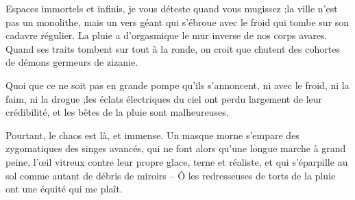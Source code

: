   Espaces immortels  et infinis, je vous  déteste quand vous mugissez  ;la ville
  n'est pas  un monolithe, mais  un vers géant qui  s'ébroue avec le  froid qui
  tombe sur son cadavre régulier.
  La pluie a  d'orgasmique le mur inverse de nos corps avares.  Quand ses traits
  tombent sur  tout à  la ronde, on  croit que chutent  des cohortes  de démons
  germeurs de zizanie.

  Quoi que ce ne  soit pas en grande pompe qu'ils s'annoncent,  ni avec le froid,
  ni la faim, ni la drogue ;les  éclats électriques du ciel ont perdu largement
  de leur crédibilité, et les bêtes de la pluie sont malheureuses.

  Pourtant,  le  chaos  est  là,  et  immense.  Un  masque  morne  s'empare  des
  zygomatiques des  singes avancés, qui  ne font  alors qu'une longue  marche à
  grand peine,  l'œil vitreux contre leur  propre glace, terne et  réaliste, et
  qui  s'éparpille  au  sol comme  autant  de  débris  de  miroirs –  Ô  les
  redresseuses de torts de la pluie ont une équité qui me plaît.

